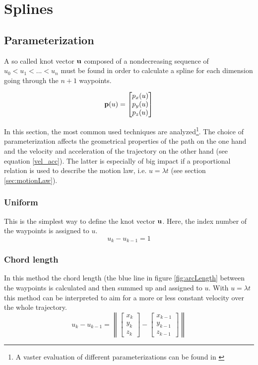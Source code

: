 \section{Splines}
\label{sec:splines}
\subsection{Parameterization}
\label{subsec:parameterization}
A so called knot vector ${\bf u}$ composed of a nondecreasing sequence of $u_0 < u_1 < ...< u_n$ must be found in order to calculate a spline for each dimension going through the $n+1$ waypoints.

\begin{equation}
{\bf p}(u) =  \begin{bmatrix} p_x(u) \\ p_y(u) \\p_z(u) \end{bmatrix}
\end{equation}


In this section, the most common used techniques are analyzed\footnote{A vaster evaluation of different parameterizations can be found in \cite{haron}}. The choice of parameterization affects the geometrical properties of the path on the one hand and the velocity and acceleration of the trajectory on the other hand (see equation \eqref{vel_acc}). The latter is especially of big impact if a proportional relation is used to describe the motion law, i.e. $u=\lambda t$ (see section \ref{sec:motionLaw}).

\subsubsection{Uniform}
This is the simplest way to define the knot vector $\bf u$. Here, the index number of the waypoints is assigned to $u$.
\begin{equation*}
u_k-u_{k-1}= 1
\end{equation*}
\subsubsection{Chord length}
In this method the chord length (the blue line in figure \ref{fig:arcLength} between the waypoints is calculated and then summed up and assigned to $u$. With $u=\lambda t$ this method can be interpreted to aim for a more or less constant velocity over the whole trajectory.
\begin{equation*}
u_k-u_{k-1}=\left \| \begin{bmatrix}x_k\\y_k\\z_k \end{bmatrix}-\begin{bmatrix}x_{k-1}\\y_{k-1}\\z_{k-1} \end{bmatrix}\right \|
\end{equation*}
